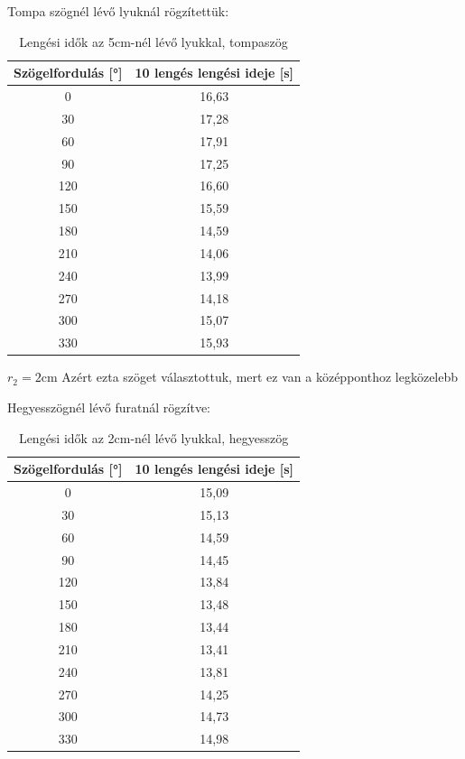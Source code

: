 \documentclass{article}
\begin{document}
Tompa szögnél lévő lyuknál rögzítettük:

\begin{table}[H]
    \centering
    \begin{tabular}{|c|c|}
        \hline
        Szögelfordulás [°] & 10 lengés lengési ideje [s] \\ \hline
         0 & 16,63 \\ \hline 
         30 & 17,28 \\ \hline
         60 & 17,91\\ \hline 
         90 & 17,25 \\ \hline
         120 & 16,60 \\ \hline 
         150 & 15,59 \\ \hline
         180 & 14,59 \\ \hline
         210 & 14,06 \\ \hline
         240 & 13,99 \\ \hline
         270 & 14,18 \\ \hline
         300 & 15,07 \\ \hline
         330 & 15,93 \\ \hline
        
    \end{tabular}
    \caption{Lengési idők az 5cm-nél lévő lyukkal, tompaszög}
    \label{tab:lengesiido_1.2}
\end{table}

$r_{2}= 2 \text{cm}$
Azért ezta szöget választottuk, mert ez van a középponthoz legközelebb

Hegyesszögnél lévő furatnál rögzítve:

\begin{table}[H]
    \centering
    \begin{tabular}{|c|c|}
        \hline
        Szögelfordulás [°] & 10 lengés lengési ideje [s] \\ \hline
         0 & 15,09 \\ \hline 
         30 & 15,13 \\ \hline
         60 & 14,59\\ \hline 
         90 & 14,45\\ \hline
         120 & 13,84 \\ \hline 
         150 & 13,48 \\ \hline
         180 & 13,44 \\ \hline
         210 & 13,41 \\ \hline
         240 & 13,81 \\ \hline
         270 & 14,25 \\ \hline
         300 & 14,73 \\ \hline
         330 & 14,98 \\ \hline
        
    \end{tabular}
    \caption{Lengési idők az 2cm-nél lévő lyukkal, hegyesszög}
    \label{tab:lengesiido_2.1}
\end{table}
\end{document}
